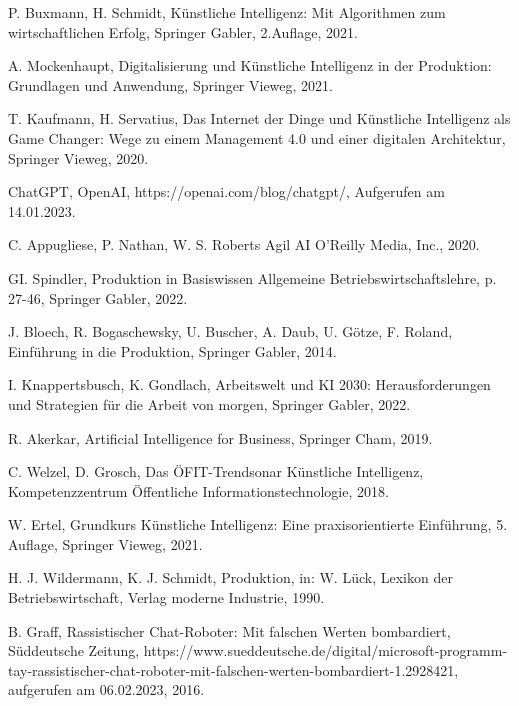 

\clearpage
{}



\begin{thebibliography}{99}

	P. Buxmann, H. Schmidt,
	Künstliche Intelligenz: Mit Algorithmen zum wirtschaftlichen Erfolg,
	Springer Gabler,
	2.Auflage,
	2021.
	
	A. Mockenhaupt,
	Digitalisierung und Künstliche Intelligenz in der Produktion: Grundlagen und Anwendung,
	Springer Vieweg,
	2021.

	T. Kaufmann, H. Servatius,
	Das Internet der Dinge und Künstliche Intelligenz als Game Changer: Wege zu einem Management 4.0 und einer digitalen Architektur,
	Springer Vieweg,
	2020.

	ChatGPT,
	OpenAI,
	https://openai.com/blog/chatgpt/,
	Aufgerufen am 14.01.2023.

	C. Appugliese, P. Nathan, W. S. Roberts
	Agil AI
	O'Reilly Media, Inc.,
	2020.

	GI. Spindler,
	Produktion in Basiswissen Allgemeine Betriebswirtschaftslehre,
	p. 27-46,
	Springer Gabler,
	2022.

	J. Bloech, R. Bogaschewsky, U. Buscher, A. Daub, U. Götze, F. Roland,
	Einführung in die Produktion,
	Springer Gabler, 
	2014.
	
	I. Knappertsbusch, K. Gondlach,
	Arbeitswelt und KI 2030: Herausforderungen und Strategien für die Arbeit von morgen,
	Springer Gabler,
	2022.

	R. Akerkar,
	Artificial Intelligence for Business,
	Springer Cham,
	2019.

	C. Welzel, D. Grosch,
	Das ÖFIT-Trendsonar Künstliche Intelligenz,
	Kompetenzzentrum Öffentliche Informationstechnologie,
	2018.

	W. Ertel,
	Grundkurs Künstliche Intelligenz: Eine praxisorientierte Einführung,
	5. Auflage,
	Springer Vieweg,
	2021.

	H. J. Wildermann, K. J. Schmidt,
	Produktion, 
	in: W. Lück, Lexikon der Betriebswirtschaft,
	Verlag moderne Industrie,
	1990.

	B. Graff,
	Rassistischer Chat-Roboter: Mit falschen Werten bombardiert,
	Süddeutsche Zeitung,
	https://www.sueddeutsche.de/digital/microsoft-programm-tay-rassistischer-chat-roboter-mit-falschen-werten-bombardiert-1.2928421,
	aufgerufen am 06.02.2023,
	2016.


\end{thebibliography}
